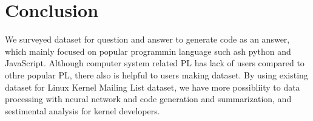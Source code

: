 \section{Conclusion}
We surveyed dataset for question and answer to generate code as an answer, which
mainly focused on popular programmin language such ash python and JavaScript.
Although computer system related PL has lack of users compared to othre popular
PL, there also is helpful to users making dataset. By using existing dataset for
Linux Kernel Mailing List dataset, we have more possibliity to data processing
with neural network and code generation and summarization, and sestimental
analysis for kernel developers.
